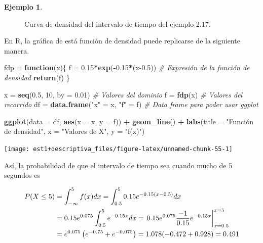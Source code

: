 \documentclass[
  11pt,
]{book}
\newenvironment{Shaded}{\begin{snugshade}}{\end{snugshade}}
\newcommand{\AttributeTok}[1]{\textcolor[rgb]{0.13,0.29,0.53}{#1}}
\newcommand{\CommentTok}[1]{\textcolor[rgb]{0.56,0.35,0.01}{\textit{#1}}}
\newcommand{\ControlFlowTok}[1]{\textcolor[rgb]{0.13,0.29,0.53}{\textbf{#1}}}
\newcommand{\DecValTok}[1]{\textcolor[rgb]{0.00,0.00,0.81}{#1}}
\newcommand{\FloatTok}[1]{\textcolor[rgb]{0.00,0.00,0.81}{#1}}
\newcommand{\FunctionTok}[1]{\textcolor[rgb]{0.13,0.29,0.53}{\textbf{#1}}}
\newcommand{\NormalTok}[1]{#1}
\newcommand{\OtherTok}[1]{\textcolor[rgb]{0.56,0.35,0.01}{#1}}
\newcommand{\SpecialCharTok}[1]{\textcolor[rgb]{0.81,0.36,0.00}{\textbf{#1}}}
\newcommand{\StringTok}[1]{\textcolor[rgb]{0.31,0.60,0.02}{#1}}
\theoremstyle{definition}
\theoremstyle{definition}
\newtheorem{example}{Ejemplo}[chapter]
\theoremstyle{definition}
\theoremstyle{definition}
\theoremstyle{remark}
\begin{document}
\begin{example}
\begin{figure}
{}

\caption{Curva de densidad del intervalo de tiempo del ejemplo 2.17.}\label{fig:ejemplo1}
\end{figure}

En R, la gráfica de está función de densidad puede replicarse de la siguiente manera.

\begin{Shaded}
\begin{Highlighting}[]
\NormalTok{fdp }\OtherTok{=} \ControlFlowTok{function}\NormalTok{(x)\{}
\NormalTok{  f }\OtherTok{=} \FloatTok{0.15}\SpecialCharTok{*}\FunctionTok{exp}\NormalTok{(}\SpecialCharTok{{-}}\FloatTok{0.15}\SpecialCharTok{*}\NormalTok{(x}\FloatTok{{-}0.5}\NormalTok{)) }\CommentTok{\# Expresión de la función de densidad}
  \FunctionTok{return}\NormalTok{(f)}
\NormalTok{\}}

\NormalTok{x }\OtherTok{=} \FunctionTok{seq}\NormalTok{(}\FloatTok{0.5}\NormalTok{, }\DecValTok{10}\NormalTok{, }\AttributeTok{by =} \FloatTok{0.01}\NormalTok{) }\CommentTok{\# Valores del dominio}
\NormalTok{f }\OtherTok{=} \FunctionTok{fdp}\NormalTok{(x) }\CommentTok{\# Valores del recorrido}
\NormalTok{df }\OtherTok{=} \FunctionTok{data.frame}\NormalTok{(}\StringTok{"x"} \OtherTok{=}\NormalTok{ x, }\StringTok{"f"} \OtherTok{=}\NormalTok{ f) }\CommentTok{\# Data frame para poder usar ggplot}

\FunctionTok{ggplot}\NormalTok{(}\AttributeTok{data =}\NormalTok{ df, }\FunctionTok{aes}\NormalTok{(}\AttributeTok{x =}\NormalTok{ x, }\AttributeTok{y =}\NormalTok{ f)) }\SpecialCharTok{+} \FunctionTok{geom\_line}\NormalTok{() }\SpecialCharTok{+} 
  \FunctionTok{labs}\NormalTok{(}\AttributeTok{title =} \StringTok{"Función de densidad"}\NormalTok{, }\AttributeTok{x =} \StringTok{"Valores de X"}\NormalTok{, }\AttributeTok{y =} \StringTok{"f(x)"}\NormalTok{)}
\end{Highlighting}
\end{Shaded}

\begin{center}\texttt{[image: est1+descriptiva\_files/figure-latex/unnamed-chunk-55-1]} \end{center}

Así, la probabilidad de que el intervalo de tiempo sea cuando mucho de 5 segundos es

\begin{equation}
\notag
\begin{split}
P(X\leq 5) &= \int_{-\infty}^{5} f(x)dx = \int_{0.5}^{5} 0.15e^{-0.15(x-0.5)}dx\\
&= 0.15e^{0.075}\int_{0.5}^{5} e^{-0.15x}dx = \left. 0.15e^{0.075}\frac{-1}{0.15}e^{-0.15x}\right|_{x = 0.5}^{x = 5}\\
&= e^{0.075}\left(e^{-0.75} + e^{-0.075} \right) = 1.078(-0.472 + 0.928) = 0.491\\
\end{split}
\end{equation}


\end{example}
\end{document}
